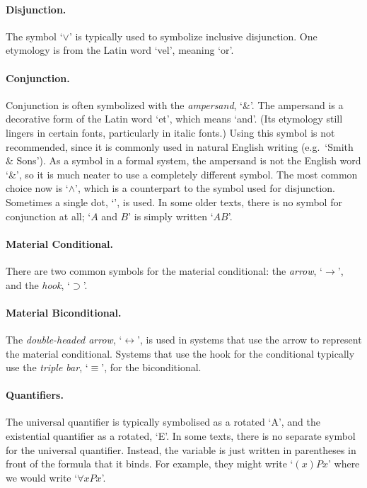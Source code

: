 \paragraph{Disjunction.} The symbol `$\vee$' is typically used to symbolize inclusive disjunction. One etymology is from the Latin word `vel', meaning `or'.%

\paragraph{Conjunction.}
Conjunction is often symbolized with the \emph{ampersand}, `{\&}'. The ampersand is a decorative form of the Latin word `et', which means `and'.  (Its etymology still lingers in certain fonts, particularly in italic fonts.) Using this symbol is not recommended, since it is commonly used in natural English writing (e.g.\ `Smith \& Sons'). As a symbol in a formal system, the ampersand is not the English word `\&', so it is much neater to use a completely different symbol. The most common choice now is `$\wedge$', which is a counterpart to the symbol used for disjunction. Sometimes a single dot, `{\scriptsize\textbullet}', is used. In some older texts, there is no symbol for conjunction at all; `$A$ and $B$' is simply written `$AB$'.

\paragraph{Material Conditional.} There are two common symbols for the material conditional: the \emph{arrow}, `$\rightarrow$', and the \emph{hook}, `$\supset$'.

\paragraph{Material Biconditional.} The \emph{double-headed arrow}, `$\leftrightarrow$', is used in systems that use the arrow to represent the material conditional. Systems that use the hook for the conditional typically use the \emph{triple bar}, `$\equiv$', for the biconditional.

\paragraph{Quantifiers.} The universal quantifier is typically symbolised as a rotated `A', and the existential quantifier as a rotated, `E'. In some texts, there is no separate symbol for the universal quantifier. Instead, the variable is just written in parentheses in front of the formula that it binds. For example, they might write `$(x)Px$' where we would write `$\forall x Px$'.

